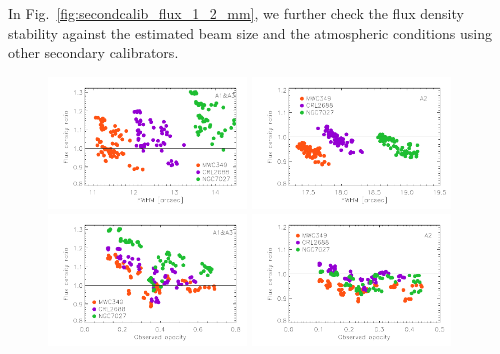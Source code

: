 In Fig.~\ref{fig:secondcalib_flux_1_2_mm}, we further check the flux density stability against
the estimated beam size and the atmospheric conditions using other secondary calibrators.




\begin{figure}[ht!]
  \begin{center}
    \includegraphics[clip=true,width=0.47\textwidth]{Figures/Calibration/plot_flux_density_ratio_3sources_FWHM_secondary_1mm.pdf}
    \includegraphics[clip=true,width=0.47\textwidth]{Figures/Calibration/plot_flux_density_ratio_3sources_FWHM_secondary_a2.pdf}
    \includegraphics[clip=true,width=0.47\textwidth]{Figures/Calibration/plot_flux_density_ratio_3sources_obstau_secondary_1mm.pdf}
    \includegraphics[clip=true,width=0.47\textwidth]{Figures/Calibration/plot_flux_density_ratio_3sources_obstau_secondary_a2.pdf}

\end{center}
\end{figure}
